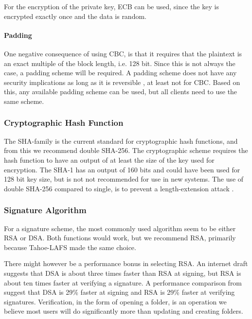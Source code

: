 \documentclass[pdftex,english,10pt,b5paper,twoside]{book}
\begin{document}
For the encryption of the private key, \ac{ECB} can be used, since the key is
encrypted exactly once and the data is random.


\paragraph{Padding} One negative consequence of using \ac{CBC}, is that it
requires that the plaintext is an exact multiple of the block length, i.e.  128
bit. Since this is not always the case, a padding scheme will be required.  A
padding scheme does not have any security implications as long as it is
reversible \cite{schneier}, at least not for \ac{CBC}. Based on this, any
available padding scheme can be used, but all clients need to use the same
scheme.

\subsubsection{Cryptographic Hash Function}

The \ac{SHA}-family is the current standard for cryptographic hash functions,
and from this we recommend double \ac{SHA}-256. The cryptographic scheme
requires the hash function to have an output of at least the size of the key
used for encryption. The \ac{SHA}-1 has an output of 160 bits and could have
been used for 128 bit key size, but is not not recommended for use in new
systems\cite{nist_sha1}. The use of double \ac{SHA}-256 compared to single, is
to prevent a length-extension attack \cite{schneier}.


\subsubsection{Signature Algorithm}

For a signature scheme, the most commonly used algorithm seem to be either
\ac{RSA} or \ac{DSA}.  Both functions would work, but we recommend \ac{RSA},
primarily because Tahoe-\ac{LAFS} made the same choice.

There might however be a performance bonus in selecting \ac{RSA}. An internet
draft \cite{dsa_sha2} suggests that \ac{DSA} is about three times faster than
\ac{RSA} at signing, but \ac{RSA} is about ten times faster at verifying a
signature. A performance comparison from \citet{msdn_perf} suggest that
\ac{DSA} is 29\% faster at signing and \ac{RSA} is 29\% faster at verifying
signatures. Verification, in the form of opening a folder, is an operation we
believe most users will do significantly more than updating and creating
folders.
\end{document}
